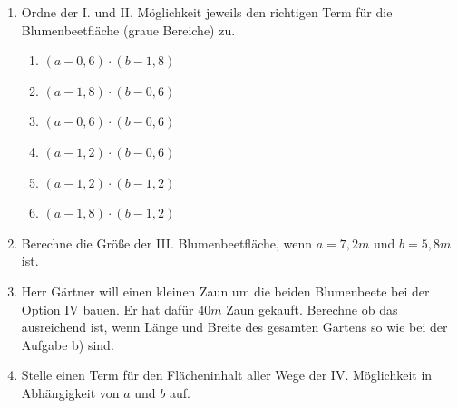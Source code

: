\documentclass[a4paper,12pt]{article}
\newcommand{\Aufgabe}[1]{
  {
  \vspace*{0.5cm}
  \textsf{\textbf{Aufgabe #1}}
  \vspace*{0.2cm}
  
  }
}
\begin{document}
\begin{enumerate}[label={\alph*)}]
  \item Ordne der I. und II. Möglichkeit jeweils den richtigen Term für die Blumenbeetfläche (graue Bereiche) zu.


\begin{minipage}[t]{0.45\textwidth}
    \begin{enumerate}[label=\arabic*.]
    \item $(a-0,6)\cdot (b-1,8)$
    \item $(a-1,8)\cdot (b-0,6)$
    \item $(a-0,6)\cdot (b-0,6)$
  \end{enumerate}
\end{minipage}
\hspace*{0.15cm}
\begin{minipage}[t]{0.35\textwidth}
    \begin{enumerate}[label=\arabic*.]
    \setcounter{enumii}{3}
    \item $(a-1,2)\cdot (b-0,6)$
    \item $(a-1,2)\cdot (b-1,2)$
    \item $(a-1,8)\cdot (b-1,2)$
  \end{enumerate}
\end{minipage}
    \vspace{10mm}


  \item Berechne die Größe der III. Blumenbeetfläche, wenn $a=7,2m$ und $b=5,8m$ ist.
    \vspace{50mm}
  \item Herr Gärtner will einen kleinen Zaun um die beiden Blumenbeete bei der Option IV bauen. Er hat dafür $40m$ Zaun gekauft. Berechne ob das ausreichend ist, wenn Länge und Breite des gesamten Gartens so wie bei der Aufgabe b) sind.
    \vspace{50mm}
  \item Stelle einen Term für den Flächeninhalt aller Wege der IV. Möglichkeit in Abhängigkeit von $a$ und $b$ auf.
\end{enumerate}


\vspace{1cm}




\end{document}
